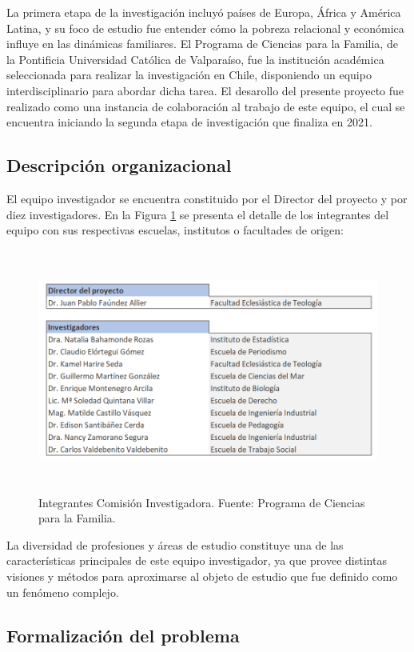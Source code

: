 \documentclass[12pt,letterpaper,spanish]{article}
\begin{document}
La primera etapa de la investigación incluyó países de Europa, África y América Latina, y su foco de estudio fue entender cómo la pobreza relacional y económica influye en las dinámicas familiares. El Programa de Ciencias para la Familia, de la Pontificia Universidad Católica de Valparaíso, fue la institución académica seleccionada para realizar la investigación en Chile, disponiendo un equipo interdisciplinario para abordar dicha tarea. El desarollo del presente proyecto fue realizado como una instancia de colaboración al trabajo de este equipo, el cual se encuentra iniciando la segunda etapa de investigación que finaliza en 2021. 

\subsection{Descripción organizacional}
El equipo investigador se encuentra constituido por el Director del proyecto y por diez investigadores. En la Figura \ref{equipoInv} se presenta el detalle de los integrantes del equipo con sus respectivas escuelas, institutos o facultades de origen:
\begin{figure}[H]
    \centering
        \includegraphics[height=8cm]{Heatmaps/EquipoInvestigador.png}
    \caption{Integrantes Comisión Investigadora. Fuente: Programa de Ciencias para la Familia.}
    \label{equipoInv}
\end{figure}
La diversidad de profesiones y áreas de estudio constituye una de las características principales de este equipo investigador, ya que provee distintas visiones y métodos para aproximarse al objeto de estudio que fue definido como un fenómeno complejo. 

\subsection{Formalización del problema}
\end{document}
